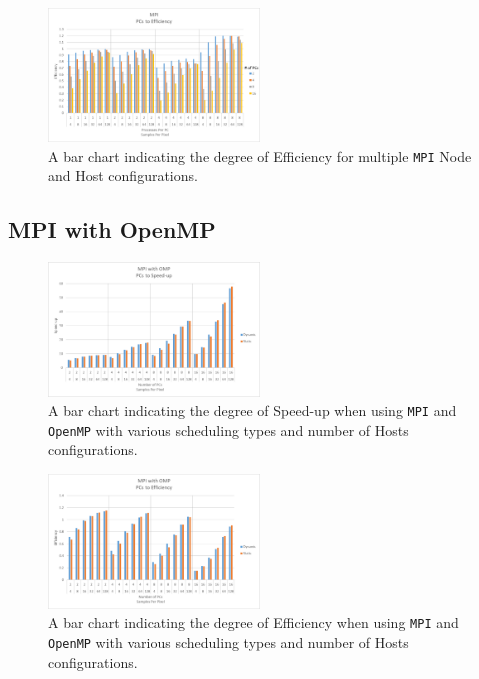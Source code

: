 \documentclass[journal,transmag]{IEEEtran}
\begin{document}
		\begin{figure}[ht]
			\centering
			\includegraphics[width = 0.5\textwidth]{chartMPIEff}
			\caption{A bar chart indicating the degree of Efficiency for multiple \texttt{MPI} Node and Host configurations.}
			\label{fig_mpi_eff}
		\end{figure}

	\subsection{MPI with OpenMP}
		\lipsum[6]
		\begin{figure}[ht]
			\centering
			\includegraphics[width = 0.5\textwidth]{chartOMPISpeed}
			\caption{A bar chart indicating the degree of Speed-up when using \texttt{MPI} and \texttt{OpenMP} with various scheduling types and number of Hosts configurations.}
			\label{fig_ompi_speed}
		\end{figure}
		
		\begin{figure}[ht]
			\centering
			\includegraphics[width = 0.5\textwidth]{chartOMPIEff}
			\caption{A bar chart indicating the degree of Efficiency when using \texttt{MPI} and \texttt{OpenMP} with various scheduling types and number of Hosts configurations.}
			\label{fig_ompi_eff}
		\end{figure}
\end{document}
